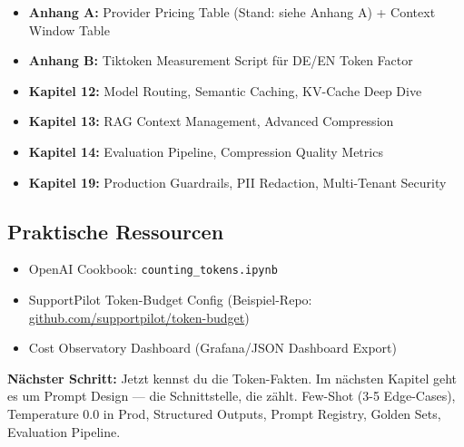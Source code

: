 \begin{itemize}[leftmargin=*]
  \item \textbf{Anhang A:} Provider Pricing Table (Stand: siehe Anhang A) + Context Window Table
  \item \textbf{Anhang B:} Tiktoken Measurement Script für DE/EN Token Factor
  \item \textbf{Kapitel 12:} Model Routing, Semantic Caching, KV-Cache Deep Dive
  \item \textbf{Kapitel 13:} RAG Context Management, Advanced Compression
  \item \textbf{Kapitel 14:} Evaluation Pipeline, Compression Quality Metrics
  \item \textbf{Kapitel 19:} Production Guardrails, PII Redaction, Multi-Tenant Security
\end{itemize}

\subsection{Praktische Ressourcen}
\label{sec:practical_resources}

\begin{itemize}[leftmargin=*]
  \item OpenAI Cookbook: \texttt{counting\_tokens.ipynb}
  \item SupportPilot Token-Budget Config (Beispiel-Repo: \url{github.com/supportpilot/token-budget})
  \item Cost Observatory Dashboard (Grafana/JSON Dashboard Export)
\end{itemize}

\textbf{Nächster Schritt:} Jetzt kennst du die Token-Fakten. Im nächsten Kapitel geht es um Prompt Design --- die Schnittstelle, die zählt. Few-Shot (3-5 Edge-Cases), Temperature 0.0 in Prod, Structured Outputs, Prompt Registry, Golden Sets, Evaluation Pipeline.


\endinput

\clearpage